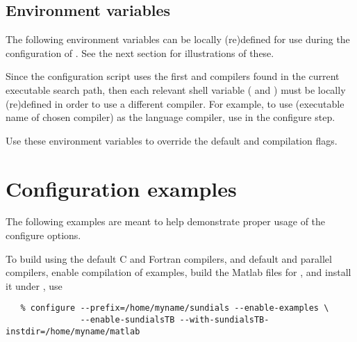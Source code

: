 \subsection*{Environment variables}


\noindent The following environment variables can be locally (re)defined for use 
during the configuration of {\sundials}. See the next section for
illustrations of these.

\begin{config}

\item {}

\item {}

  Since the configuration script uses the first {\C} and {\F} compilers found in
  the current executable search path, then each relevant shell variable (
  and ) must be locally (re)defined in order to use a different compiler. 
  For example, to use  (executable name of chosen compiler) as the {\C}
  language compiler, use  in the configure step.

\item {}

\item {}

  Use these environment variables to override the default {\C} and {\F}
  compilation flags.

\end{config}




\section{Configuration examples}

The following examples are meant to help demonstrate proper usage of the configure options.


To build {\sundials} using the default C and Fortran compilers,
and default  and  parallel compilers, enable compilation of examples,
build the Matlab  files for {\sundialsTB}, and install it under 
, use
\begin{verbatim}
   % configure --prefix=/home/myname/sundials --enable-examples \
               --enable-sundialsTB --with-sundialsTB-instdir=/home/myname/matlab
\end{verbatim}


